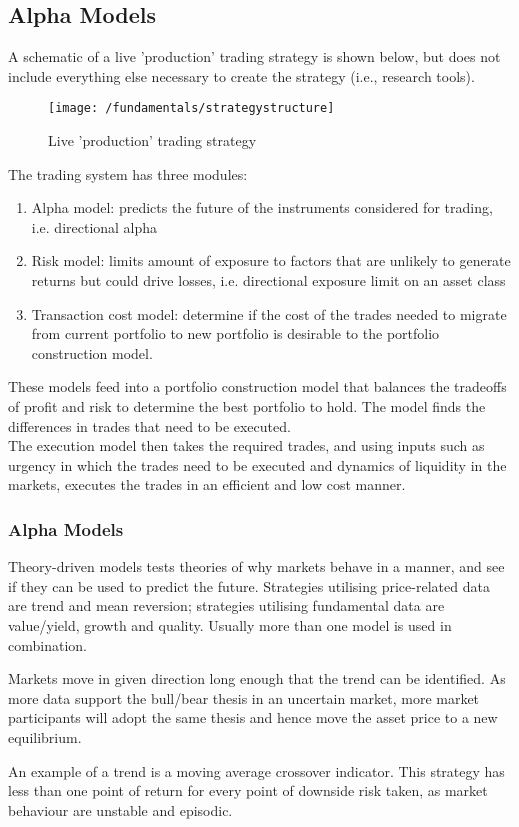 \subsection{Alpha Models}

A schematic of a live 'production' trading strategy is shown below, but does not include everything else necessary to create the strategy (i.e., research tools).
\begin{figure}[H]
\centering
\texttt{[image: /fundamentals/strategystructure]}
\caption{Live 'production' trading strategy}
\end{figure}
The trading system has three modules:
\begin{enumerate}[label=\roman*.]
\setlength{\itemsep}{0pt}
\item Alpha model: predicts the future of the instruments considered for trading, i.e. directional alpha
\item Risk model: limits amount of exposure to factors that are unlikely to generate returns but could drive losses, i.e. directional exposure limit on an asset class
\item Transaction cost model: determine if the cost of the trades needed to migrate from current portfolio to new portfolio is desirable to the portfolio construction model.
\end{enumerate}
These models feed into a portfolio construction model that balances the tradeoffs of profit and risk to determine the best portfolio to hold. The model finds the differences in trades that need to be executed.\\
The execution model then takes the required trades, and using inputs such as urgency in which the trades need to be executed and dynamics of liquidity in the markets, executes the trades in an efficient and low cost manner.

\subsubsection{Alpha Models}

Theory-driven models tests theories of why markets behave in a manner, and see if they can be used to predict the future. Strategies utilising price-related data are trend and mean reversion; strategies utilising fundamental data are value/yield, growth and quality. Usually more than one model is used in combination.

\begin{definition}
 Markets move in given direction long enough that the trend can be identified. As more data support the bull/bear thesis in an uncertain market, more market participants will adopt the same thesis and hence move the asset price to a new equilibrium.
\end{definition}
An example of a trend is a moving average crossover indicator. This strategy has less than one point of return for every point of downside risk taken, as market behaviour are unstable and episodic.

